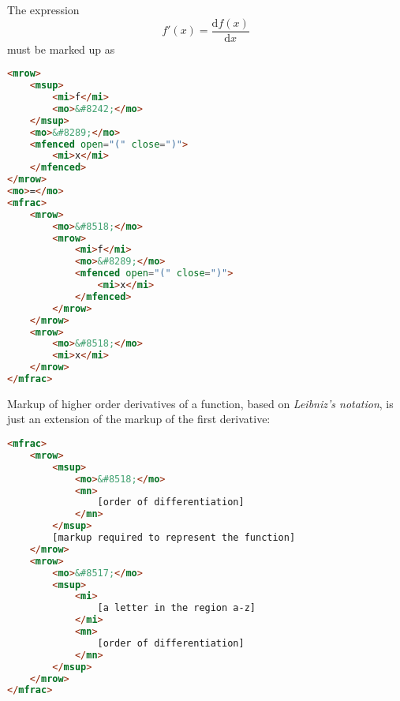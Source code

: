 \documentclass[english,a4paper,11pt]{article}
\begin{document}

\begin{eksempler}
The expression
\begin{equation}
f'(x) = \frac{\text{d}f(x)}{\text{d}x}
\end{equation}
must be marked up as
\begin{lstlisting}[language=HTML]
<mrow>
	<msup>
		<mi>f</mi>
		<mo>&#8242;</mo>
	</msup>
	<mo>&#8289;</mo>
	<mfenced open="(" close=")">
		<mi>x</mi>
	</mfenced>
</mrow>
<mo>=</mo>
<mfrac>
	<mrow>
		<mo>&#8518;</mo>
		<mrow>
			<mi>f</mi>
			<mo>&#8289;</mo>
			<mfenced open="(" close=")">
				<mi>x</mi>
			</mfenced>
		</mrow>
	</mrow>
	<mrow>
		<mo>&#8518;</mo>
		<mi>x</mi>
	</mrow>
</mfrac>
\end{lstlisting}
\end{eksempler}

Markup of higher order derivatives of a function, based on \emph{Leibniz's notation}, is just an extension of the markup of the first derivative:
\begin{lstlisting}[language=HTML]
<mfrac>
	<mrow>
		<msup>
			<mo>&#8518;</mo>
			<mn>
				[order of differentiation]
			</mn>
		</msup>
		[markup required to represent the function]
	</mrow>
	<mrow>
		<mo>&#8517;</mo>
		<msup>
			<mi>
				[a letter in the region a-z]
			</mi>
			<mn>
				[order of differentiation]
			</mn>
		</msup>
	</mrow>
</mfrac>
\end{lstlisting}
\end{document}

